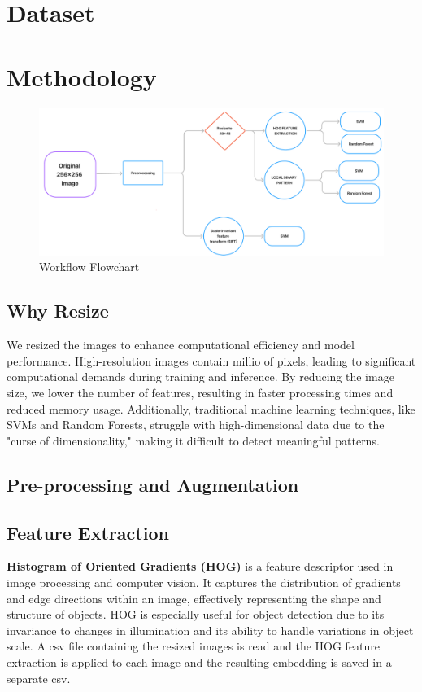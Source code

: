 \documentclass[10pt,twocolumn,letterpaper]{article}
\begin{document}
\section{Dataset}
\section{Methodology}
\begin{figure}[h]
    \centering
    \includegraphics[width=\linewidth]{1.png}
    \caption{Workflow Flowchart}
\end{figure}
\subsection{Why Resize}
We resized the images to enhance computational efficiency and model performance. High-resolution images contain millio of pixels, leading to significant computational demands during training and inference. By reducing the image size, we lower the number of features, resulting in faster processing times and reduced memory usage. Additionally, traditional machine learning techniques, like SVMs and Random Forests, struggle with high-dimensional data due to the "curse of dimensionality," making it difficult to detect meaningful patterns.
\subsection{Pre-processing and Augmentation}

\subsection{Feature Extraction}
\textbf{Histogram of Oriented Gradients (HOG)} is a feature descriptor used in image processing and computer vision. It captures the distribution of gradients and edge directions within an image, effectively representing the shape and structure of objects. HOG is especially useful for object detection due to its invariance to changes in illumination and its ability to handle variations in object scale. 
A csv file containing the resized images is read and the HOG feature extraction is applied to each image and the resulting embedding is saved in a separate csv.
\end{document}

